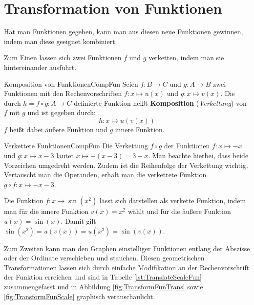 \section{Transformation von Funktionen}

Hat man Funktionen gegeben, kann man aus diesen neue Funktionen gewinnen, indem man diese geeignet kombiniert.

Zum Einen lassen sich zwei Funktionen $f$ und $g$ verketten, indem man sie hintereinander ausführt.

\begin{definition}{Komposition von Funktionen}{CompFun}
    Seien $f: B \to C$ und $g: A \to B$ zwei Funktionen mit den Rechenvorschriften $f: x \mapsto u(x)$ und $g: x \mapsto v(x)$. Die durch $h = f \circ g: A \to C$ definierte Funktion heißt \textbf{Komposition} (\emph{Verkettung}) von $f$ mit $g$ und ist gegeben durch:
    $$
        h: x \mapsto u(v(x))
    $$
    $f$ heißt dabei äußere Funktion und $g$ innere Funktion.
\end{definition}

\begin{example}{Verkettete Funktionen}{CompFun}
    Die Verkettung $f \circ g$ der Funktionen $f: x \mapsto -x$ und $g: x \mapsto x-3$ lautet $x \mapsto -(x-3) = 3-x$. Man beachte hierbei, dass beide Vorzeichen umgedreht werden. Zudem ist die Reihenfolge der Verkettung wichtig. Vertauscht man die Operanden, erhält man die verkettete Funktion $g \circ f: x \mapsto -x-3$.

    Die Funktion $f: x \to \sin(x^2)$ lässt sich darstellen als verkette Funktion, indem man für die innere Funktion $v(x) = x^2$ wählt und für die äußere Funktion $u(x) = \sin(x)$. Damit gilt $\sin(x^2) = u(v(x)) = u(x^2) = \sin(v(x))$.
\end{example}

Zum Zweiten kann man den Graphen einstelliger Funktionen entlang der Abszisse oder der Ordinate verschieben und stauchen. Diesen geometrischen Transformationen lassen sich durch einfache Modifikation an der Rechenvorschrift der Funktion erreichen und sind in Tabelle  \ref{lst:TranslateScaleFun} zusammengefasst und in Abbildung \ref{fig:TransformFunTrans} sowie \ref{fig:TransformFunScale} graphisch veranschaulicht.

